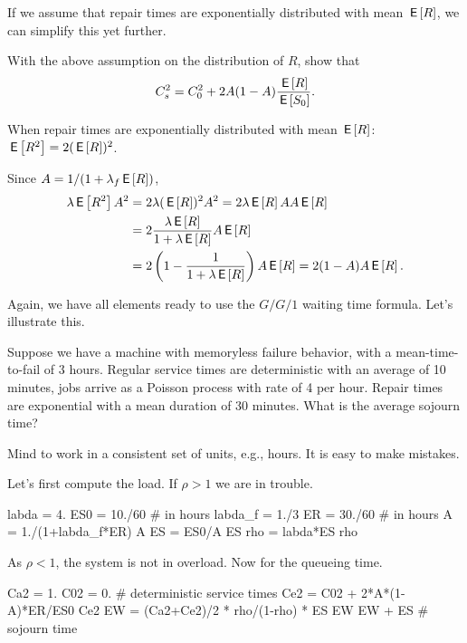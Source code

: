 If we assume that repair times are exponentially distributed with mean $\,\mathsf{E}\left[R\right]$, we can simplify this yet further.

\begin{exercise}[\faCalculator]
With the above assumption on the distribution of $R$, show that
  \begin{equation*}
    C_s^2 = C_0^2 + 2 A(1-A) \frac{\,\mathsf{E}\left[R\right]}{\,\mathsf{E}\left[S_0\right]}.
  \end{equation*}
\begin{solution} 
When repair times are exponentially distributed with mean $\,\mathsf{E}\left[R\right]$:  $\,\mathsf{E}\left[R^2\right]=2(\,\mathsf{E}\left[R\right])^2$. 

Since $A=1/(1+\lambda_f \,\mathsf{E}\left[R\right])$, 
  \begin{equation*}
    \begin{split}
    \lambda \,\mathsf{E}\left[R^2\right] A^2 
&= 2\lambda (\,\mathsf{E}\left[R\right])^2 A^2 = 2 \lambda \,\mathsf{E}\left[R\right] A A \,\mathsf{E}\left[R\right] \\
&= 2 \frac{\lambda \,\mathsf{E}\left[R\right] }{1+\lambda \,\mathsf{E}\left[R\right]} A \,\mathsf{E}\left[R\right] \\
&= 2 \left(1-\frac{1}{1+\lambda \,\mathsf{E}\left[R\right]}\right) A \,\mathsf{E}\left[R\right]  = 2(1-A)A \,\mathsf{E}\left[R\right].
    \end{split}
  \end{equation*}
\end{solution}
\end{exercise}

Again, we have all elements ready to use the $G/G/1$ waiting time formula. Let's illustrate this. 

\begin{exercise}[\faPhoto]
  Suppose we have a machine with memoryless failure behavior, with a mean-time-to-fail of $3$ hours. Regular service times are deterministic with an average of 10 minutes, jobs arrive as a Poisson process with rate of 4 per hour.  Repair times are exponential with a mean duration of 30 minutes. What is the average sojourn time?
  \begin{hint}
    Mind to work in a consistent set of units, e.g., hours. It is easy to make mistakes. 
  \end{hint}
  \begin{solution}
Let's first compute the load. If $\rho>1$ we are in trouble.
    \begin{pyconsole}
labda = 4.
ES0 = 10./60 # in hours
labda_f = 1./3
ER = 30./60 # in hours
A = 1./(1+labda_f*ER)
A
ES = ES0/A
ES
rho = labda*ES
rho
    \end{pyconsole}
As $\rho<1$, the system is not in overload. Now for the queueing time.
\begin{pyconsole}
Ca2 = 1.
C02 = 0. # deterministic service times
Ce2 = C02 + 2*A*(1-A)*ER/ES0
Ce2
EW = (Ca2+Ce2)/2 * rho/(1-rho) * ES
EW
EW + ES # sojourn time
\end{pyconsole}
  \end{solution}
\end{exercise}

